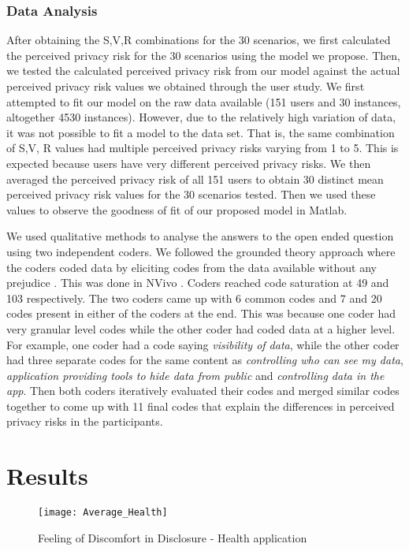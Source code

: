 \documentclass[10pt]{article}
\begin{document}
\subsubsection{Data Analysis}

After obtaining the S,V,R combinations for the 30 scenarios, we first calculated the perceived privacy risk for the 30 scenarios using the model we propose. Then, we tested the calculated perceived privacy risk from our model against the actual perceived privacy risk values we obtained through the user study. We first attempted to fit our model on the raw data available (151 users and 30 instances, altogether 4530 instances). However, due to the relatively high variation of data, it was not possible to fit a model to the data set. That is, the same combination of S,V, R values had multiple perceived privacy risks varying from 1 to 5. This is expected because users have very different perceived privacy risks. We then averaged the perceived privacy risk of all 151 users to obtain 30 distinct mean perceived privacy risk values for the 30 scenarios tested. Then we used these values to observe the goodness of fit of our proposed model in Matlab. 

We used qualitative methods to analyse the answers to the open ended question using two independent coders. We followed the grounded theory approach where the coders coded data by eliciting codes from the data available without any prejudice \cite {wong2017eliciting}. This was done in NVivo \cite {saldana2015coding}. Coders reached code saturation at 49 and 103 respectively. The two coders came up with 6 common codes and 7 and 20 codes present in either of the coders at the end. This was because one coder had very granular level codes while the other coder had coded data at a higher level. For example, one coder had a code saying \textit {visibility of data}, while the other coder had three separate codes for the same content as \textit {controlling who can see my data}, \textit {application providing tools to hide data from public} and \textit {controlling data in the app}. Then both coders iteratively evaluated their codes and merged similar codes together to come up with 11 final codes that explain the differences in perceived privacy risks in the participants.

\section {Results}

\begin{figure}[h]
\begin{center}
\texttt{[image: Average\_Health]}
\caption{Feeling of Discomfort in Disclosure - Health  application}
\end{center}
\end{figure}
\end{document}
